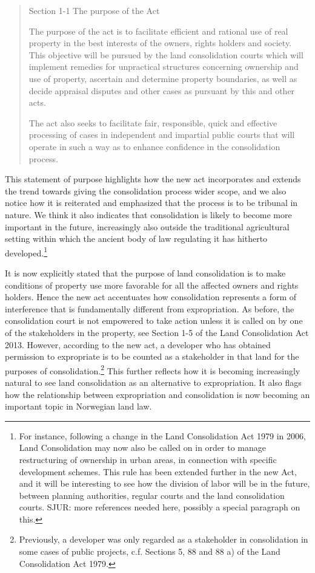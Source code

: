 \documentclass[10pt]{article} %
\newcommand{\sjur}[1]{SJUR: #1}
\begin{document}
\begin{quote}
Section 1-1 The purpose of the Act

The purpose of the act is to facilitate efficient and rational use of real property in the best interests of the owners, rights holders and society. This objective will be pursued by the land consolidation courts which will implement remedies for unpractical structures concerning ownership and use of property, ascertain and determine property boundaries, as well as decide appraisal disputes and other cases as pursuant by this and other acts.

The act also seeks to facilitate fair, responsible, quick and effective processing of cases in independent and impartial public courts that will operate in such a way as to enhance confidence in the consolidation process.
\end{quote}

This statement of purpose highlights how the new act incorporates and extends the trend towards giving the consolidation process wider scope, and we also notice how it is reiterated and emphasized that the process is to be tribunal in nature. We think it also indicates that consolidation is likely to become more important in the future, increasingly also outside the traditional agricultural setting within which the ancient body of law regulating it has hitherto developed.\footnote{For instance, following a change in the Land Consolidation Act 1979 in 2006, Land Consolidation may now also be called on in order to manage restructuring of ownership in urban areas, in connection with specific development schemes. This rule has been extended further in the new Act, and it will be interesting to see how the division of labor will be in the future, between planning authorities, regular courts and the land consolidation courts. \sjur{more references needed here, possibly a special paragraph on this.}}

It is now explicitly stated that the purpose of land consolidation is to make conditions of property use more favorable for all the affected owners and rights holders. Hence the new act accentuates how consolidation represents a form of interference that is fundamentally different from expropriation. As before, the consolidation court is not empowered to take action unless it is called on by one of the stakeholders in the property, see Section 1-5 of the Land Consolidation Act 2013. However, according to the new act, a developer who has obtained permission to expropriate is to be counted as a stakeholder in that land for the purposes of consolidation.\footnote{Previously, a developer was only regarded as a stakeholder in consolidation in some cases of public projects, c.f. Sections 5, 88 and 88 a) of the Land Consolidation Act 1979.} This further reflects how it is becoming increasingly natural to see land consolidation as an alternative to expropriation. It also flags how the relationship between expropriation and consolidation is now becoming an important topic in Norwegian land law.
\end{document}
